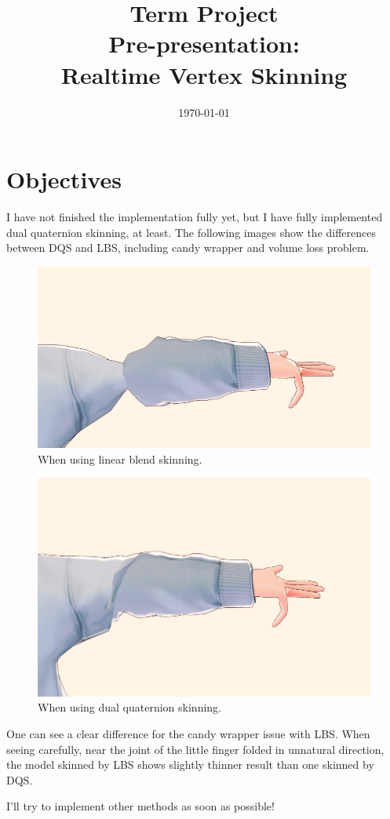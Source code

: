 \documentclass{homework}
\title{%
    Term Project \\[2mm] Pre-presentation:\\[2mm]
    Realtime Vertex Skinning
}
\date{\today}
\begin{document}
    \maketitle

    \section{Objectives}

    I have not finished the implementation fully yet, but I have fully implemented dual quaternion skinning, at least. The following images show the differences between DQS and LBS, including candy wrapper and volume loss problem.

    \begin{figure}[H]
        \includegraphics[width=\textwidth]{linear_blend.png}
        \caption{When using linear blend skinning.}
    \end{figure}

    \begin{figure}[H]
        \includegraphics[width=\textwidth]{dual_quat.png}
        \caption{When using dual quaternion skinning.}
    \end{figure}

    One can see a clear difference for the candy wrapper issue with LBS. When seeing carefully, near the joint of the little finger folded in unnatural direction, the model skinned by LBS shows slightly thinner result than one skinned by DQS.

    I'll try to implement other methods as soon as possible!

\end{document}
